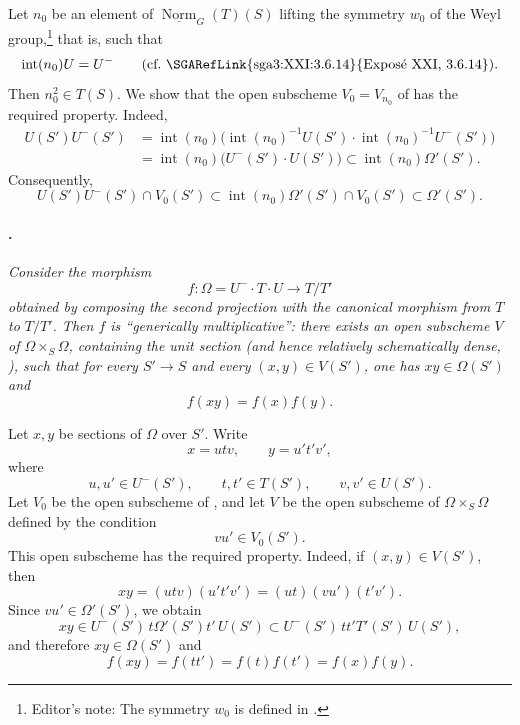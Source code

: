 Let \(n_0\) be an element of
\(\underline{\operatorname{Norm}}_G(T)(S)\) lifting the symmetry
\(w_0\) of the Weyl group,\footnote{Editor's note: The symmetry
\(w_0\) is defined in .} that is, such that
\[
  \operatorname{int}(n_0)U=U^-
  \qquad\text{\textup{(cf.\ \SGARefLink{sga3:XXI:3.6.14}{Exposé XXI, 3.6.14})}}.
\]
Then \(n_0^2\in T(S)\). We show that the open subscheme
\(V_0=V_{n_0}\) of  has the required property. Indeed,
\[
\begin{aligned}
  U(S')U^-(S')
  &=
  \operatorname{int}(n_0)
  \bigl(
    \operatorname{int}(n_0)^{-1}U(S')
    \cdot\operatorname{int}(n_0)^{-1}U^-(S')
  \bigr)\\
  &=
  \operatorname{int}(n_0)\bigl(U^-(S')\cdot U(S')\bigr)
  \subset\operatorname{int}(n_0)\Omega'(S').
\end{aligned}
\]
Consequently,
\[
  U(S')U^-(S')\cap V_0(S')
  \subset
  \operatorname{int}(n_0)\Omega'(S')\cap V_0(S')
  \subset\Omega'(S').
\]

\paragraph{.}
{\itshape Consider the morphism
\[
  f:\Omega=U^-\cdot T\cdot U\longrightarrow T/T'
\]
obtained by composing the second projection with the canonical
morphism from \(T\) to \(T/T'\). Then \(f\) is
``generically multiplicative'': there exists an open subscheme
\(V\) of \(\Omega\times_S\Omega\), containing the unit section
\textup{(and hence relatively schematically dense,
)}, such that for every \(S'\to S\) and every
\((x,y)\in V(S')\), one has \(xy\in\Omega(S')\) and
\[
  f(xy)=f(x)f(y).
\]}

Let \(x,y\) be sections of \(\Omega\) over \(S'\). Write
\[
  x=utv,\qquad y=u't'v',
\]
where
\[
  u,u'\in U^-(S'),\qquad t,t'\in T(S'),\qquad v,v'\in U(S').
\]
Let \(V_0\) be the open subscheme of , and let \(V\) be the
open subscheme of \(\Omega\times_S\Omega\) defined by the condition
\[
  vu'\in V_0(S').
\]
This open subscheme has the required property. Indeed, if
\((x,y)\in V(S')\), then
\[
  xy=(utv)(u't'v')=(ut)(vu')(t'v').
\]
Since \(vu'\in\Omega'(S')\), we obtain
\[
  xy
  \in U^-(S')\,t\Omega'(S')t'\,U(S')
  \subset U^-(S')\,tt'T'(S')\,U(S'),
\]
and therefore \(xy\in\Omega(S')\) and
\[
  f(xy)=f(tt')=f(t)f(t')=f(x)f(y).
\]

